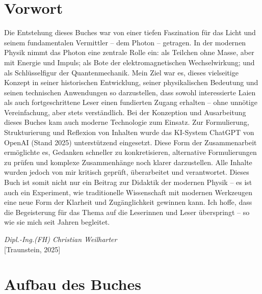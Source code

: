 
\chapter*{Vorwort}



Die Entstehung dieses Buches war von einer tiefen Faszination für das Licht und seinem fundamentalen Vermittler – dem Photon – getragen. In der modernen Physik nimmt das Photon eine zentrale Rolle ein: als Teilchen ohne Masse, aber mit Energie und Impuls; als Bote der elektromagnetischen Wechselwirkung; und als Schlüsselfigur der Quantenmechanik.
	\noindent
Mein Ziel war es, dieses vielseitige Konzept in seiner historischen Entwicklung, seiner physikalischen Bedeutung und seinen technischen Anwendungen so darzustellen, dass sowohl interessierte Laien als auch fortgeschrittene Leser einen fundierten Zugang erhalten – ohne unnötige Vereinfachung, aber stets verständlich.
	\noindent
Bei der Konzeption und Ausarbeitung dieses Buches kam auch moderne Technologie zum Einsatz. Zur Formulierung, Strukturierung und Reflexion von Inhalten wurde das KI-System ChatGPT von OpenAI (Stand 2025) unterstützend eingesetzt. Diese Form der Zusammenarbeit ermöglichte es, Gedanken schneller zu konkretisieren, alternative Formulierungen zu prüfen und komplexe Zusammenhänge noch klarer darzustellen.
Alle Inhalte wurden jedoch von mir kritisch geprüft, überarbeitet und verantwortet.
	\noindent
Dieses Buch ist somit nicht nur ein Beitrag zur Didaktik der modernen Physik – es ist auch ein Experiment, wie traditionelle Wissenschaft mit modernen Werkzeugen eine neue Form der Klarheit und Zugänglichkeit gewinnen kann.
	\noindent
Ich hoffe, dass die Begeisterung für das Thema auf die Leserinnen und Leser überspringt – so wie sie mich seit Jahren begleitet.



\begin{flushright}
	\textit{Dipl.-Ing.(FH) Christian Weilharter} \\
	\vspace{0.5em}
	[Traunstein, 2025]
\end{flushright}

\chapter*{Aufbau des Buches}

